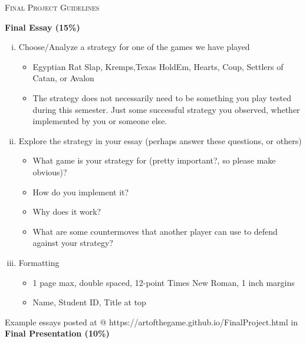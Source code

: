 \documentclass[12 pt]{article}
\begin{document}
\begin{center}
{\Large \textsc{Final Project Guidelines}}
\end{center}
\renewcommand{\arraystretch}{2}
\noindent\textbf{Final Essay (15\%)}
\begin{enumerate}[(i)]
\item Choose/Analyze a strategy for one of the games we have played
\begin{itemize}
\item Egyptian Rat Slap, Kremps,Texas HoldEm, Hearts, Coup, Settlers of Catan, or Avalon
\item The strategy does not necessarily need to be something you play tested during this semester. Just some successful strategy you observed, whether implemented by you or someone else.
\end{itemize}
\item Explore the strategy in your essay (perhaps answer these questions, or others)
\begin{itemize}
\item What game is your strategy for (pretty important?, so please make obvious)?
\item How do you implement it?
\item Why does it work?
\item What are some countermoves that another player can use to defend against your strategy?
\end{itemize}
\item Formatting \begin{itemize}
\item 1 page max, double spaced, 12-point Times New Roman, 1 inch margins
\item Name, Student ID, Title at top
\end{itemize}
\end{enumerate}
Example essays posted at @ https://artofthegame.github.io/FinalProject.html
 in
\noindent\textbf{Final Presentation (10\%)} 
\end{document}
